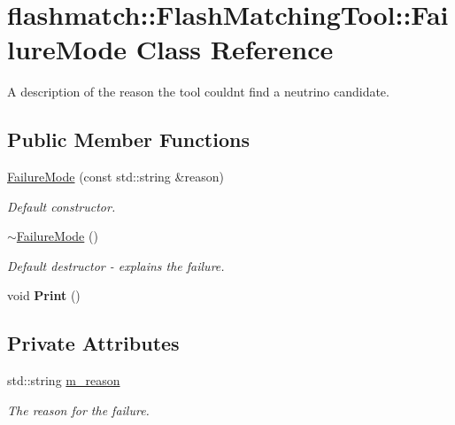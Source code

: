 \hypertarget{classflashmatch_1_1FlashMatchingTool_1_1FailureMode}{}\section{flashmatch\+:\+:Flash\+Matching\+Tool\+:\+:Failure\+Mode Class Reference}
\label{classflashmatch_1_1FlashMatchingTool_1_1FailureMode}


A description of the reason the tool couldn\textquotesingle{}t find a neutrino candidate.  


\subsection*{Public Member Functions}
\begin{DoxyCompactItemize}
\item 
\hyperlink{classflashmatch_1_1FlashMatchingTool_1_1FailureMode_adcdc5adb8c7321605b8f9ef7740ea209}{Failure\+Mode} (const std\+::string \&reason)
\begin{DoxyCompactList}\small\item\em Default constructor. \end{DoxyCompactList}\item 
\hyperlink{classflashmatch_1_1FlashMatchingTool_1_1FailureMode_ab6ee2b8304974614e71440359a068acd}{$\sim$\+Failure\+Mode} ()\hypertarget{classflashmatch_1_1FlashMatchingTool_1_1FailureMode_ab6ee2b8304974614e71440359a068acd}{}\label{classflashmatch_1_1FlashMatchingTool_1_1FailureMode_ab6ee2b8304974614e71440359a068acd}

\begin{DoxyCompactList}\small\item\em Default destructor -\/ explains the failure. \end{DoxyCompactList}\item 
void {\bfseries Print} ()\hypertarget{classflashmatch_1_1FlashMatchingTool_1_1FailureMode_a2e0b3138a293e90410b3037952c819bc}{}\label{classflashmatch_1_1FlashMatchingTool_1_1FailureMode_a2e0b3138a293e90410b3037952c819bc}

\end{DoxyCompactItemize}
\subsection*{Private Attributes}
\begin{DoxyCompactItemize}
\item 
std\+::string \hyperlink{classflashmatch_1_1FlashMatchingTool_1_1FailureMode_ad236e712ac187b60a5647ad4bf29cf07}{m\+\_\+reason}\hypertarget{classflashmatch_1_1FlashMatchingTool_1_1FailureMode_ad236e712ac187b60a5647ad4bf29cf07}{}\label{classflashmatch_1_1FlashMatchingTool_1_1FailureMode_ad236e712ac187b60a5647ad4bf29cf07}

\begin{DoxyCompactList}\small\item\em The reason for the failure. \end{DoxyCompactList}\end{DoxyCompactItemize}


